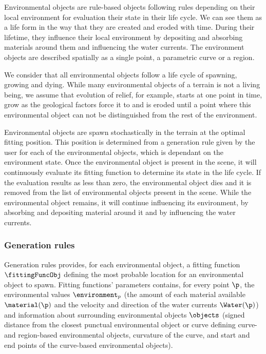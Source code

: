 Environmental objects are rule-based objects following rules depending on their local environment for evaluation their state in their life cycle. We can see them as a life form in the way that they are created and eroded with time. During their lifetime, they influence their local environment by depositing and absorbing materials around them and influencing the water currents. The environment objects are described spatially as a single point, a parametric curve or a region.

We consider that all environmental objects follow a life cycle of spawning, growing and dying. While many environmental objects of a terrain is not a living being, we assume that evolution of relief, for example, starts at one point in time, grow as the geological factors force it to and is eroded until a point where this environmental object can not be distinguished from the rest of the environment. 

Environmental objects are spawn stochastically in the terrain at the optimal fitting position. This position is determined from a generation rule given by the user for each of the environmental objects, which is dependant on the environment state.
Once the environmental object is present in the scene, it will continuously evaluate its fitting function to determine its state in the life cycle. If the evaluation results as less than zero, the environmental object dies and it is removed from the list of environmental objects present in the scene. While the environmental object remains, it will continue influencing its environment, by absorbing and depositing material around it and by influencing the water currents. 

\subsubsection{Generation rules}
\label{EnvironmentObjects-sec:generation-rules}
Generation rules provides, for each environmental object, a fitting function $\fittingFuncObj$ defining the most probable location for an environmental object to spawn. Fitting functions' parameters contains, for every point $\p$, the environmental values $\environment_p$ (the amount of each material available $\material(\p)$ and the velocity and direction of the water currents $\Water(\p)$) and information about surrounding environmental objects $\objects$ (signed distance from the closest punctual environmental object or curve defining curve- and region-based environmental objects, curvature of the curve, and start and end points of the curve-based environmental objects).

